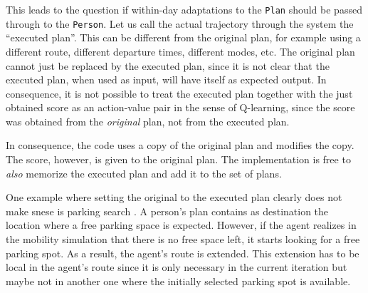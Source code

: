 
This leads to the question if within-day adaptations to the \verb$Plan$ should be passed through to the \verb$Person$.  Let us call the actual trajectory through the system the ``executed plan''.  This can be different from the original plan, for example using a different route, different departure times, different modes, etc.  The original plan cannot just be replaced by the executed plan, since it is not clear that the executed plan, when used as input, will have itself as expected output.  In consequence, it is not possible to treat the executed plan together with the just obtained score as an action-value pair in the sense of Q-learning, since the score was obtained from the \emph{original} plan, not from the executed plan.

In consequence, the code uses a copy of the original plan and modifies the copy.  The score, however, is given to the original plan.  The implementation is free to  \emph{also} memorize the executed plan and add it to the set of plans.




One example where setting the original to the executed plan clearly does not make snese is parking search .
A person's plan contains as destination the location where a free parking space is expected. However, if the agent realizes in the mobility simulation that there is no free space left, it starts looking for a free parking spot. As a result, the agent's route is extended. This extension has to be local in the agent's route since it is only necessary in the current iteration
but maybe not in another one where the initially selected parking spot is available.

